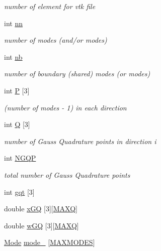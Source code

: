 \begin{DoxyCompactItemize}
\begin{DoxyCompactList}\small\item\em number of element for vtk file \end{DoxyCompactList}\item 
int \hyperlink{classStdel_af4d02765d362e2f0469633ff78734f89}{nn}
\begin{DoxyCompactList}\small\item\em number of modes (and/or modes) \end{DoxyCompactList}\item 
int \hyperlink{classStdel_ad1d9acc38335d3fd779ba5c14f1507f8}{nb}
\begin{DoxyCompactList}\small\item\em number of boundary (shared) modes (or modes) \end{DoxyCompactList}\item 
int \hyperlink{classStdel_a05cbb3f2a3fa0bc04a74e347dc6574cf}{P} \mbox{[}3\mbox{]}
\begin{DoxyCompactList}\small\item\em (number of modes -\/ 1) in each direction \end{DoxyCompactList}\item 
int \hyperlink{classStdel_a82074e598ad5af5ec45a3257a3c2b684}{Q} \mbox{[}3\mbox{]}
\begin{DoxyCompactList}\small\item\em number of Gauss Quadrature points in direction i \end{DoxyCompactList}\item 
int \hyperlink{classStdel_aa3cff31280606cd3eb95af770dd6f5b4}{N\+G\+QP}
\begin{DoxyCompactList}\small\item\em total number of Gauss Quadrature points \end{DoxyCompactList}\item 
int \hyperlink{classStdel_afc321b60cb9b577b71794e346196c07a}{gqt} \mbox{[}3\mbox{]}
\item 
double \hyperlink{classStdel_adedcb4d4faa12adf348054780a3b2c1a}{x\+GQ} \mbox{[}3\mbox{]}\mbox{[}\hyperlink{MyOptions_8h_af708e94d886ba3f59582612949cac702}{M\+A\+XQ}\mbox{]}
\item 
double \hyperlink{classStdel_af99d72cbda49c30e23e83705c95a1c5b}{w\+GQ} \mbox{[}3\mbox{]}\mbox{[}\hyperlink{MyOptions_8h_af708e94d886ba3f59582612949cac702}{M\+A\+XQ}\mbox{]}
\item 
\hyperlink{classMode}{Mode} \hyperlink{classStdel_a7a09cf048f14496813a914ca6afe7366}{mode\+\_\+} \mbox{[}\hyperlink{MyOptions_8h_aa75ccd382acf88cec3e9c8025c1f88b7}{M\+A\+X\+M\+O\+D\+ES}\mbox{]}

\end{DoxyCompactItemize}
